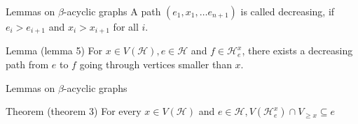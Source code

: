 \begin{frame}[t]{Lemmas on $\beta$-acyclic graphs}
	A path $(e_1, x_1, \dots e_{n+1})$ is called decreasing, if $e_i > e_{i+1}$ and $x_i > x_{i+1}$ for all $i$.
	\begin{block}{Lemma (lemma 5)}
		For $x \in V(\mathcal{H}), e \in \mathcal{H}$ and $f \in \mathcal{H}^x_e$, there exists a decreasing path from $e$ to $f$ going through vertices smaller than $x$.
	\end{block}
\end{frame}

\begin{frame}[t]{Lemmas on $\beta$-acyclic graphs}
	\begin{block}{Theorem (theorem 3)}
		For every $x \in V(\mathcal{H})$ and $e \in \mathcal{H}, V(\mathcal{H}^x_e) \cap V_{\geq x} \subseteq e$
	\end{block}

	\begin{center}
		\resizebox{.5\columnwidth}{!}{
		
		}
	\end{center}


\end{frame}


